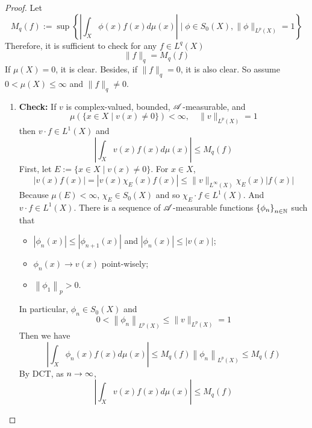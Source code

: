 \begin{proof}
	Let
	\begin{equation*}
		M_q(f):=\sup \left\{\left|\int_X \phi(x) f(x) d \mu(x)\right| \mid \phi \in S_0(X),\|\phi\|_{L^p(X)}=1\right\}
	\end{equation*}
	Therefore, it is sufficient to check for any $f \in L^q(X)$
	\begin{equation*}
		\|f\|_{q} = M_q(f)
	\end{equation*}
	If $\mu(X) = 0$, it is clear. Besides, if $\|f\|_{q} = 0$, it is also clear. So assume $0 < \mu(X) \leq \infty$ and $\|f\|_{q} \neq 0$.
	\begin{enumerate}[label=(\roman*)]
		\item \textbf{Check:} If $v$ is complex-valued, bounded, $\mathscr{A}$-measurable, and
		\begin{equation*}
			\mu(\{x \in X \mid v(x) \neq 0\})<\infty, \quad\|v\|_{L^p(X)}=1
		\end{equation*}
		then $v \cdot f \in L^1(X)$ and
		\begin{equation*}
			\left|\int_X v(x) f(x) d \mu(x)\right| \leq M_q(f)
		\end{equation*}
		First, let $E:=\{x \in X \mid v(x) \neq 0\}$. For $x \in X$,
		\begin{equation*}
			|v(x) f(x)|=\left|v(x) \chi_E(x) f(x)\right| \leq\|v\|_{L^{\infty}(X)} \chi_E(x)|f(x)|
		\end{equation*}
		Because $\mu(E) < \infty$, $\chi_E \in S_0(X)$ and so $\chi_E \cdot f \in L^1(X)$. And $v \cdot f \in L^1(X)$. There is a sequence of $\mathscr{A}$-measurable functions $\left\{\phi_n\right\}_{n \in \mathbb{N}}$ such that
		\begin{itemize}
			\item $\left|\phi_n(x)\right| \leq\left|\phi_{n+1}(x)\right|$ and $\left|\phi_n(x)\right| \leq|v(x)|$;
			\item $\phi_n(x) \rightarrow v(x)$ point-wisely;
			\item $\left\|\phi_1\right\|_{p}>0$.
		\end{itemize}
		In particular, $\phi_n \in S_0(X)$ and
		\begin{equation}
			0<\left\|\phi_n\right\|_{L^p(X)} \leq\|v\|_{L^p(X)}=1
		\end{equation}
		Then we have
		\begin{equation*}
			\left|\int_X \phi_n(x) f(x) d \mu(x)\right| \leq M_q(f)\left\|\phi_n\right\|_{L^p(X)} \leq M_q(f)
		\end{equation*}
		By DCT, as $n \rightarrow \infty$,
		\begin{equation*}
			\left|\int_X v(x) f(x) d \mu(x)\right| \leq M_q(f)
		\end{equation*}


\end{enumerate}
\end{proof}
